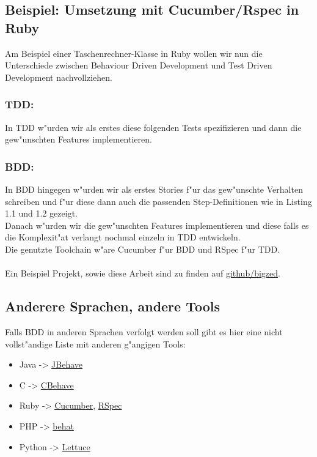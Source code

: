   \subsection{Beispiel: Umsetzung mit Cucumber/Rspec in Ruby}
    Am Beispiel einer Taschenrechner-Klasse in Ruby wollen wir nun die 
    Unterschiede zwischen Behaviour Driven Development und Test Driven 
    Development nachvollziehen.
    \subsubsection{TDD:}
      In TDD w"urden wir als erstes diese folgenden Tests spezifizieren 
      und dann die gew"unschten Features implementieren.
      

    \subsubsection{BDD:}
      In BDD hingegen w"urden wir als erstes Stories f"ur das gew"unschte
      Verhalten schreiben und f"ur diese dann auch die passenden Step-Definitionen
      wie in Listing 1.1 und 1.2 gezeigt.\\
      Danach w"urden wir die gew"unschten Features implementieren und diese
      falls es die Komplexit"at verlangt nochmal einzeln in TDD entwickeln.\\
      Die genutzte Toolchain w"are Cucumber f"ur BDD und RSpec f"ur TDD.\\\\
      Ein Beispiel Projekt, sowie diese Arbeit sind zu finden auf 
      \href{http://github.com/bigzed/proseminar-bdd}{github/bigzed}.

  \subsection{Anderere Sprachen, andere Tools}
    Falls BDD in anderen Sprachen verfolgt werden soll gibt es hier eine nicht
    vollst"andige Liste mit anderen g"angigen Tools:
    \begin{itemize}
      \item Java -> \href{http://jbehave.org/}{JBehave}
      \item C -> \href{http://code.google.com/p/cbehave/}{CBehave}
      \item Ruby -> \href{http://cukes.info}{Cucumber}, \href{http://rspec.info}{RSpec}
      \item PHP -> \href{http://behat.org}{behat}
      \item Python -> \href{http://lettuce.it}{Lettuce}
    \end{itemize}